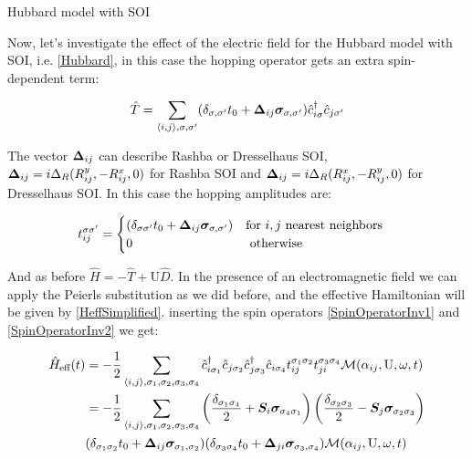 \begin{section}{Hubbard model with SOI}

Now, let's investigate the effect of the electric field for the Hubbard model with SOI, i.e. \ref{Hubbard}, in this case the hopping operator gets an extra spin-dependent term:

\begin{equation}
\hat{T} = \sum_{\langle i,j \rangle, \sigma, \sigma'}(\delta_{\sigma, \sigma'} t_0 + \boldsymbol{\Delta}_{ij} \boldsymbol{\sigma}_{\sigma, \sigma'})\hat{c}_{i \sigma}^\dagger \hat{c}_{j \sigma'}
\end{equation}

The vector $\boldsymbol{\Delta}_{ij}$ can describe Rashba or Dresselhaus SOI, $\boldsymbol{\Delta}_{ij} = i\Delta_R(R_{ij}^y, -R_{ij}^x, 0)$ for Rashba SOI and $\boldsymbol{\Delta}_{ij} = i\Delta_R(R_{ij}^x, -R_{ij}^y, 0)$ for Dresselhaus SOI. 
In this case the hopping amplitudes are:

\begin{equation}
\label{HoppHubbSOI}
t_{ij}^{\sigma \sigma'} = \begin{cases}
	(\delta_{\sigma \sigma'}t_0+\boldsymbol{\Delta}_{ij} \boldsymbol{\sigma}_{\sigma, \sigma'}) & \text{for } i, j \text{ nearest neighbors} \\
	0 & \text{ otherwise}
\end{cases} \quad
\end{equation}
 
And as before $\hat{H} = -\hat{T} + \text{U}\hat{D}$. In the presence of an electromagnetic field we can apply the Peierls substitution as we did before, and the effective Hamiltonian will be given by \ref{HeffSimplified}.  inserting the spin operators \ref{SpinOperatorInv1} and \ref{SpinOperatorInv2} we get:

\begin{align}
\hat{H}_{\text{eff}}(t) &= - \frac{1}{2} \sum_{\langle i,j \rangle, \sigma_1, \sigma_2, \sigma_3, \sigma_4}\hat{c}_{i \sigma_1}^\dagger \hat{c}_{j \sigma_2} \hat{c}_{j \sigma_3}^\dagger \hat{c}_{i \sigma_4} t_{ij}^{\sigma_1 \sigma_2} t_{ji}^{\sigma_3 \sigma_4} \mathcal{M}(\alpha_{ij}, \text{U}, \omega, t) \nonumber \\
&= - \frac{1}{2} \sum_{\langle i,j \rangle, \sigma_1, \sigma_2, \sigma_3, \sigma_4} \left( \frac{\delta_{\sigma_1 \sigma_4}}{2} + \boldsymbol{S}_i\boldsymbol{\sigma}_{\sigma_4 \sigma_1} \right) \left( \frac{\delta_{\sigma_2 \sigma_3}}{2} - \boldsymbol{S}_j\boldsymbol{\sigma}_{\sigma_2 \sigma_3} \right) \nonumber \\ &(\delta_{\sigma_1 \sigma_2}t_0+\boldsymbol{\Delta}_{ij} \boldsymbol{\sigma}_{\sigma_1, \sigma_2}) (\delta_{\sigma_3 \sigma_4}t_0+\boldsymbol{\Delta}_{ji} \boldsymbol{\sigma}_{\sigma_3, \sigma_4}) \mathcal{M}(\alpha_{ij}, \text{U}, \omega, t) \label{HeffHubbSOI1}
\end{align}


\end{section}

